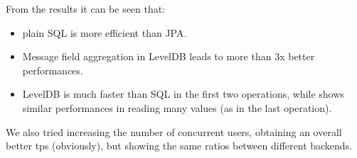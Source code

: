 \documentclass[10pt]{article}
\begin{document}
From the results it can be seen that:
\begin{itemize}
    \item plain SQL is more efficient than JPA.
    \item Message field aggregation in LevelDB leads to more than 3x better performances.
    \item LevelDB is much faster than SQL in the first two operations, while shows
            similar performances in reading many values (as in the last operation).
\end{itemize}

We also tried increasing the number of concurrent users, obtaining an overall 
better tps (obviously), but showing the same ratios between different backends.
\end{document}
